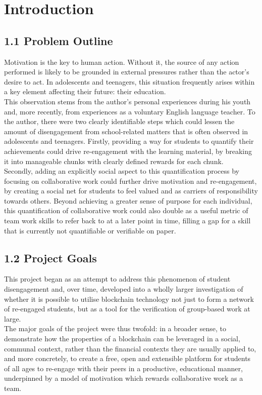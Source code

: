 \documentclass[12pt]{report}
\begin{document}
\section{Introduction}\label{introduction}

\subsection{1.1 Problem Outline}\label{problem-outline}

Motivation is the key to human action. Without it, the source of any
action performed is likely to be grounded in external pressures rather
than the actor's desire to act. In adolescents and teenagers, this
situation frequently arises within a key element affecting their future:
their education.\\
This observation stems from the author's personal experiences during his
youth and, more recently, from experiences as a voluntary English
language teacher. To the author, there were two clearly identifiable
steps which could lessen the amount of disengagement from school-related
matters that is often observed in adolescents and teenagers. Firstly,
providing a way for students to quantify their achievements could drive
re-engagement with the learning material, by breaking it into manageable
chunks with clearly defined rewards for each chunk.\\
Secondly, adding an explicitly social aspect to this quantification
process by focusing on collaborative work could further drive motivation
and re-engagement, by creating a social net for students to feel valued
and as carriers of responsibility towards others. Beyond achieving a
greater sense of purpose for each individual, this quantification of
collaborative work could also double as a useful metric of team work
skills to refer back to at a later point in time, filling a gap for a
skill that is currently not quantifiable or verifiable on paper.

\subsection{1.2 Project Goals}\label{project-goals}

This project began as an attempt to address this phenomenon of student
disengagement and, over time, developed into a wholly larger
investigation of whether it is possible to utilise blockchain technology
not just to form a network of re-engaged students, but as a tool for the
verification of group-based work at large.\\
The major goals of the project were thus twofold: in a broader sense, to
demonstrate how the properties of a blockchain can be leveraged in a
social, communal context, rather than the financial contexts they are
usually applied to, and more concretely, to create a free, open and
extensible platform for students of all ages to re-engage with their
peers in a productive, educational manner, underpinned by a model of
motivation which rewards collaborative work as a team.
\end{document}
